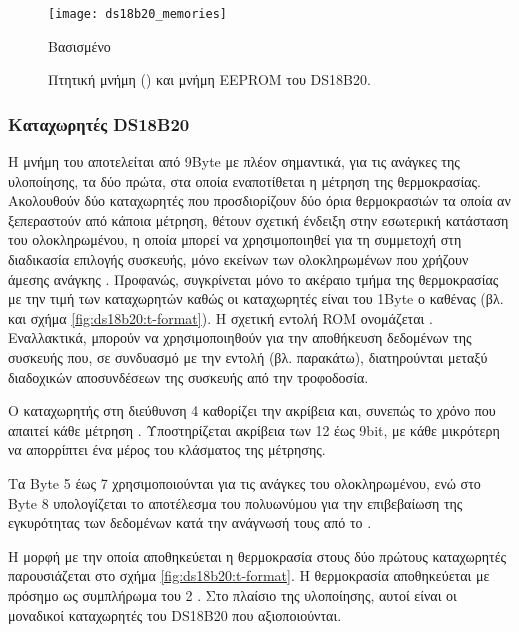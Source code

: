 \begin{figure}
    \caption{Πτητική μνήμη () και μνήμη EEPROM του DS18B20.
    \label{fig:ds18b20:memories}}
    \begin{center}
    \texttt{[image: ds18b20\_memories]}
    \end{center}
    Βασισμένο 
\end{figure}


\subsubsection{Καταχωρητές DS18B20}
\label{ssubsec:ds18b20:registers}

Η μνήμη του αποτελείται από 9Byte με πλέον σημαντικά, για τις ανάγκες της
υλοποίησης, τα δύο πρώτα, στα οποία εναποτίθεται η μέτρηση της θερμοκρασίας.
Ακολουθούν δύο καταχωρητές που προσδιορίζουν δύο όρια θερμοκρασιών τα οποία αν
ξεπεραστούν από κάποια μέτρηση, θέτουν σχετική ένδειξη στην εσωτερική κατάσταση
του ολοκληρωμένου, η οποία μπορεί να χρησιμοποιηθεί για τη συμμετοχή στη
διαδικασία επιλογής  συσκευής, μόνο εκείνων των ολοκληρωμένων που
χρήζουν άμεσης ανάγκης \parencite[4--5]{ds18b20}. Προφανώς, συγκρίνεται μόνο το
ακέραιο τμήμα της θερμοκρασίας με την τιμή των καταχωρητών καθώς οι καταχωρητές
είναι του 1Byte ο καθένας (βλ. και σχήμα \ref{fig:ds18b20:t-format}). Η σχετική
εντολή ROM ονομάζεται . Εναλλακτικά, μπορούν να χρησιμοποιηθούν
για την αποθήκευση δεδομένων της συσκευής που, σε συνδυασμό με την εντολή
 (βλ. παρακάτω), διατηρούνται μεταξύ διαδοχικών αποσυνδέσεων
της συσκευής από την τροφοδοσία.

Ο καταχωρητής στη διεύθυνση 4 καθορίζει την ακρίβεια και, συνεπώς το χρόνο που
απαιτεί κάθε μέτρηση \parencite[4,8]{ds18b20}. Υποστηρίζεται ακρίβεια των 12 έως
9bit, με κάθε μικρότερη να απορρίπτει ένα μέρος του κλάσματος της μέτρησης.

Τα Byte 5 έως 7 χρησιμοποιούνται για τις ανάγκες του ολοκληρωμένου, ενώ στο Byte
8 υπολογίζεται το αποτέλεσμα του πολυωνύμου για την επιβεβαίωση της εγκυρότητας
των δεδομένων κατά την ανάγνωσή τους από το .

Η μορφή με την οποία αποθηκεύεται η θερμοκρασία στους δύο πρώτους καταχωρητές
παρουσιάζεται στο σχήμα \ref{fig:ds18b20:t-format}. Η θερμοκρασία αποθηκεύεται
με πρόσημο ως συμπλήρωμα του 2 \parencite[3]{ds18b20}. Στο πλαίσιο της
υλοποίησης, αυτοί είναι οι μοναδικοί καταχωρητές του DS18B20 που αξιοποιούνται.

